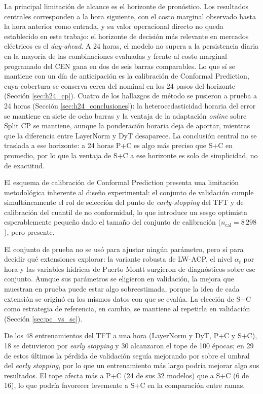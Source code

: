 La principal limitación de alcance es el horizonte de pronóstico. Los resultados centrales corresponden a la hora siguiente, con el costo marginal observado hasta la hora anterior como entrada, y su valor operacional directo no queda establecido en este trabajo: el horizonte de decisión más relevante en mercados eléctricos es el \textit{day-ahead}. A 24 horas, el modelo no supera a la persistencia diaria en la mayoría de las combinaciones evaluadas y frente al costo marginal programado del CEN gana en dos de seis barras comparables. Lo que sí se mantiene con un día de anticipación es la calibración de Conformal Prediction, cuya cobertura se conserva cerca del nominal en los 24 pasos del horizonte (Sección \ref{sec:h24_cp}). Cuatro de los hallazgos de método se pusieron a prueba a 24 horas (Sección \ref{sec:h24_conclusiones}): la heterocedasticidad horaria del error se mantiene en siete de ocho barras y la ventaja de la adaptación \textit{online} sobre Split CP se mantiene, aunque la ponderación horaria deja de aportar, mientras que la diferencia entre LayerNorm y DyT desaparece. La conclusión central no se traslada a ese horizonte: a 24 horas P+C es algo más preciso que S+C en promedio, por lo que la ventaja de S+C a ese horizonte es solo de simplicidad, no de exactitud.

El esquema de calibración de Conformal Prediction presenta una limitación metodológica inherente al diseño experimental: el conjunto de validación cumple simultáneamente el rol de selección del punto de \textit{early-stopping} del TFT y de calibración del cuantil de no conformidad, lo que introduce un sesgo optimista esperablemente pequeño dado el tamaño del conjunto de calibración ($n_\text{cal} = 8\,298$), pero presente.

El conjunto de prueba no se usó para ajustar ningún parámetro, pero sí para decidir qué extensiones explorar: la variante robusta de LW-ACP, el nivel $\alpha_t$ por hora y las variables hídricas de Puerto Montt surgieron de diagnósticos sobre ese conjunto. Aunque sus parámetros se eligieron en validación, la mejora que muestran en prueba puede estar algo sobreestimada, porque la idea de cada extensión se originó en los mismos datos con que se evalúa. La elección de S+C como estrategia de referencia, en cambio, se mantiene al repetirla en validación (Sección \ref{sec:pc_vs_sc}).

De los 48 entrenamientos del TFT a una hora (LayerNorm y DyT, P+C y S+C), 18 se detuvieron por \textit{early stopping} y 30 alcanzaron el tope de 100 épocas; en 29 de estos últimos la pérdida de validación seguía mejorando por sobre el umbral del \textit{early stopping}, por lo que un entrenamiento más largo podría mejorar algo sus resultados. El tope afecta más a P+C (24 de sus 32 modelos) que a S+C (6 de 16), lo que podría favorecer levemente a S+C en la comparación entre ramas.

